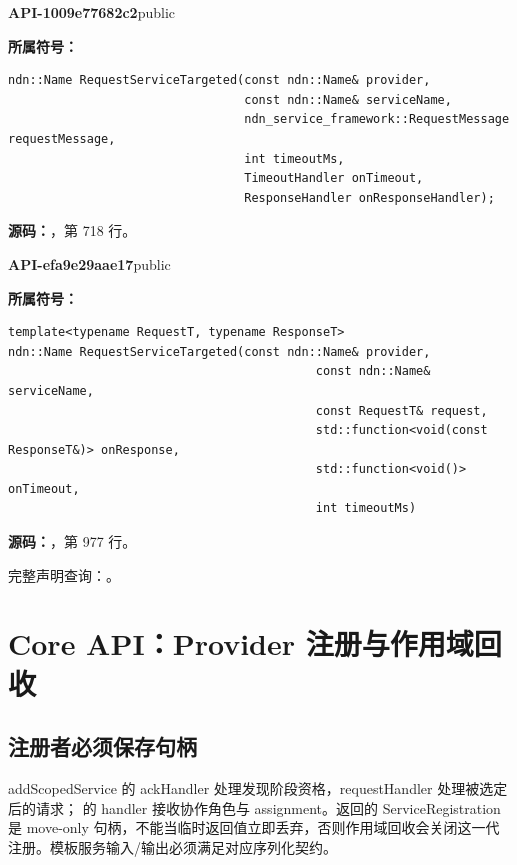 \textbf{API-1009e77682c2}\quad public\par
\textbf{所属符号：}\par
\begin{Verbatim}[fontsize=\footnotesize,breaklines,breakanywhere]
ndn::Name RequestServiceTargeted(const ndn::Name& provider,
                                 const ndn::Name& serviceName,
                                 ndn_service_framework::RequestMessage requestMessage,
                                 int timeoutMs,
                                 TimeoutHandler onTimeout,
                                 ResponseHandler onResponseHandler);
\end{Verbatim}
\textbf{源码：}，第 718 行。\par

\textbf{API-efa9e29aae17}\quad public\par
\textbf{所属符号：}\par
\begin{Verbatim}[fontsize=\footnotesize,breaklines,breakanywhere]
template<typename RequestT, typename ResponseT>
ndn::Name RequestServiceTargeted(const ndn::Name& provider,
                                           const ndn::Name& serviceName,
                                           const RequestT& request,
                                           std::function<void(const ResponseT&)> onResponse,
                                           std::function<void()> onTimeout,
                                           int timeoutMs)
\end{Verbatim}
\textbf{源码：}，第 977 行。\par

完整声明查询：。

\section{Core API：Provider 注册与作用域回收}

\subsection{注册者必须保存句柄}
addScopedService 的 ackHandler 处理发现阶段资格，requestHandler 处理被选定后的请求； 的 handler 接收协作角色与 assignment。返回的 ServiceRegistration 是 move-only 句柄，不能当临时返回值立即丢弃，否则作用域回收会关闭这一代注册。模板服务输入/输出必须满足对应序列化契约。

